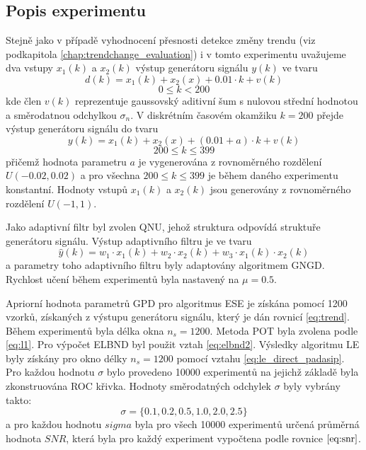 \subsection{Popis experimentu}
Stejně jako v případě vyhodnocení přesnosti detekce změny trendu (viz podkapitola \ref{chap:trendchange_evaluation}) i v tomto experimentu uvažujeme dva vstupy $x_1(k)$ a $x_2(k)$ výstup generátoru signálu $y(k)$ ve tvaru 
\begin{equation}
    \label{eq:trend}
    d(k)=x_1(k)+x_2(x)+0.01\cdot k + v(k)
\end{equation}
\begin{equation*}
0\leq k < 200
\end{equation*}
kde člen $v(k)$ reprezentuje gaussovský aditivní šum s nulovou střední hodnotou a směrodatnou odchylkou $\sigma_n$. V diskrétním časovém okamžiku $k=200$ přejde výstup generátoru signálu do tvaru
\begin{equation}
y(k)=x_1(k)+x_2(x)+(0.01 + a)\cdot k + v(k)
\end{equation}
\begin{equation*}
200 \leq k \leq 399
\end{equation*}
přičemž hodnota parametru $a$ je vygenerována z rovnoměrného rozdělení $U(-0.02,0.02)$ a pro všechna $200 \leq k \leq 399$ je během daného experimentu konstantní. Hodnoty vstupů $x_1(k)$ a $x_2(k)$ jsou generovány z rovnoměrného rozdělení $U(-1,1)$. 
\par 
Jako adaptivní filtr byl zvolen QNU, jehož struktura odpovídá struktuře generátoru signálu. Výstup adaptivního filtru je ve tvaru
\begin{equation}
\hat{y}(k)=w_1\cdot x_1(k)+w_2\cdot x_2(k) + w_3 \cdot x_1(k) \cdot x_2(k)
\end{equation}
a parametry toho adaptivního filtru byly adaptovány algoritmem GNGD. Rychlost učení během experimentů byla nastavený na $\mu=0.5$.
\par 
Apriorní hodnota parametrů GPD pro algoritmus ESE je získána pomocí 1200 vzorků, získaných z výstupu generátoru signálu, který je dán rovnicí \ref{eq:trend}. Během experimentů byla délka okna $n_s=1200$. Metoda POT byla zvolena podle \ref{eq:l1}. Pro výpočet ELBND byl použit vztah \ref{eq:elbnd2}. Výsledky algoritmu LE byly získány pro okno délky $n_s=1200$ pomocí vztahu \ref{eq:le_direct_padasip}. Pro každou hodnotu $\sigma$ bylo provedeno 10000 experimentů na jejichž základě byla zkonstruována ROC křivka. Hodnoty směrodatných odchylek $\sigma$ byly vybrány takto:
\begin{equation}
\sigma=\{0.1,0.2,0.5,1.0,2.0,2.5 \}
\end{equation}
a pro každou hodnotu $sigma$ byla pro všech 10000 experimentů určená průměrná hodnota $SNR$, která byla pro každý experiment vypočtena podle rovnice $\ref{eq:snr}$. 


